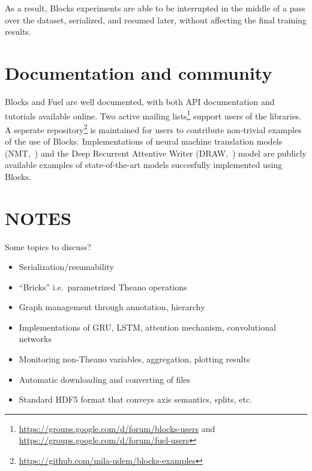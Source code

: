 \documentclass[twoside,11pt]{article}
\begin{document}
As a result, Blocks experiments are able to be interrupted in the middle of a
pass over the dataset, serialized, and resumed later, without affecting the
final training results.

\section{Documentation and community}

Blocks and Fuel are well documented, with both API documentation and tutorials
available online. Two active mailing
lists\footnote{\url{https://groups.google.com/d/forum/blocks-users} and
\url{https://groups.google.com/d/forum/fuel-users}} support users of the
libraries. A seperate
repository\footnote{\url{https://github.com/mila-udem/blocks-examples}} is
maintained for users to contribute non-trivial examples of the use of Blocks.
Implementations of neural machine translation models
(NMT,~\cite{bahdanau2015neural}) and the Deep Recurrent Attentive Writer
(DRAW,~\cite{gregor2015draw}) model are publicly available examples of
state-of-the-art models succesfully implemented using Blocks.

\section{NOTES}

Some topics to discuss?

\begin{itemize}
  \item Serialization/resumability
  \item ``Bricks'' i.e.\ parametrized Theano operations
  \item Graph management through annotation, hierarchy
  \item Implementations of GRU, LSTM, attention mechanism, convolutional
  networks
  \item Monitoring non-Theano variables, aggregation, plotting results
\end{itemize}

\begin{itemize}
  \item Automatic downloading and converting of files
  \item Standard HDF5 format that conveys axis semantics, splits, etc.
\end{itemize}






\end{document}
